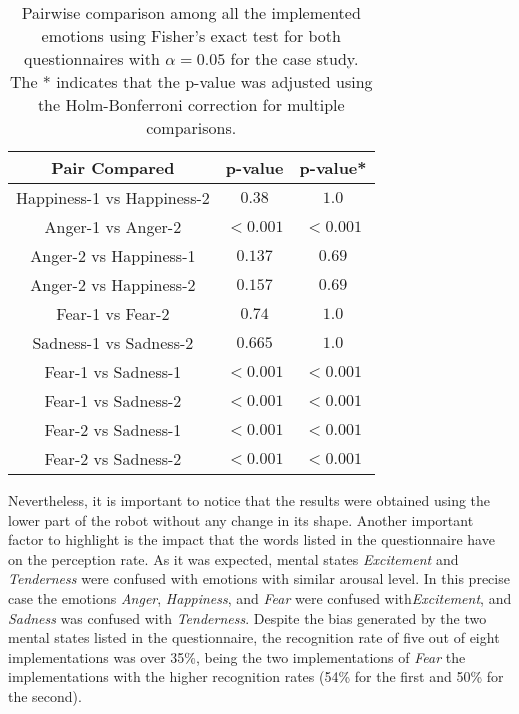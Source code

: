 \begin{table}
\centering
\small
\caption{Pairwise comparison among all the implemented emotions using Fisher's exact test for both questionnaires with $\alpha = 0.05$ for the  case study. The * indicates that the p-value was adjusted using the Holm-Bonferroni correction for multiple comparisons.}
		\label{table:result_compare_fourth}
		\begin{tabular}{|c|c|c|}
			\hline	
\textbf{Pair Compared} & \textbf{p-value} & \textbf{p-value*}\\	
			\hline
			Happiness-1 vs Happiness-2 &$0.38$&$1.0$\\
			\hline
			Anger-1 vs Anger-2 & $<0.001$ 
			& $<0.001$
			\\
			\hline
			Anger-2 vs Happiness-1 & $0.137$&$0.69$\\
			\hline
			Anger-2 vs Happiness-2 & $0.157$&$0.69$\\
			\hline
			Fear-1 vs Fear-2 & $0.74$&$1.0$\\
			\hline
			Sadness-1 vs Sadness-2 & $0.665$&$1.0$\\
			\hline
			Fear-1 vs Sadness-1& $<0.001$ 
			& $<0.001$
			\\
			\hline
			Fear-1 vs Sadness-2 & $<0.001$
			& $<0.001$
			\\
			\hline
			Fear-2 vs Sadness-1 & $<0.001$
			& $<0.001$
			\\
			\hline
			Fear-2 vs Sadness-2 & $<0.001$
			& $<0.001$
			\\
			\hline
			\end{tabular}
\end{table}  
 
Nevertheless, it is important to notice that the results were obtained using the lower part of the robot without any change in its shape. Another important factor to highlight is the impact that the words listed in the questionnaire have on the perception rate. As it was expected, mental states \textit{Excitement} and \textit{Tenderness} were confused with emotions with similar arousal level. In this precise case the emotions \textit{Anger}, \textit{Happiness}, and \textit{Fear} were confused with\textit{Excitement}, and \textit{Sadness} was confused with \textit{Tenderness}. Despite the bias generated by the two mental states listed in the questionnaire, the recognition rate of five out of eight implementations was over 35\%, being the two implementations of \textit{Fear} the implementations with the higher recognition rates (54\% for the first and 50\% for the second).

